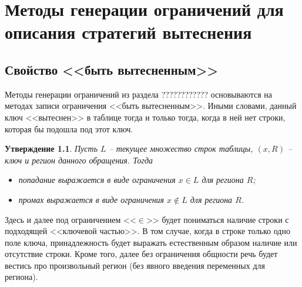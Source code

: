 \documentclass[14pt]{extreport}
\newtheorem{lemma}{Лемма}
\newtheorem{utv}{Утверждение}
\newtheorem*{sld}{Следствие}
\newcommand{\LRU}{\textsf{LRU}\xspace}
\begin{document}
%


\chapter{Методы генерации ограничений для описания стратегий вытеснения}

\section{Свойство <<быть вытесненным>>}

Методы генерации ограничений из раздела ???????????? основываются на методах записи ограничения <<быть вытесненным>>. Иными словами, данный ключ <<вытеснен>> в таблице тогда и только тогда, когда в ней нет строки, которая бы подошла под этот ключ.

\begin{utv}\label{hit_miss_simpleform}
Пусть $L$ -- текущее множество строк таблицы, $(x,R)$ -- ключ и регион данного обращения. Тогда
\begin{itemize}
\item попадание выражается в виде ограничения $x \in L$ для региона $R$;
\item промах выражается в виде ограничения $x \notin L$ для региона $R$.
\end{itemize}
\end{utv}

Здесь и далее под ограничением <<$\in$>> будет пониматься наличие строки с подходящей <<ключевой частью>>. В том случае, когда в строке только одно поле ключа, принадлежность будет выражать естественным образом наличие или отсутствие строки. Кроме того, далее без ограничения общности речь будет вестись про произвольный регион (без явного введения переменных для региона).
\end{document}
